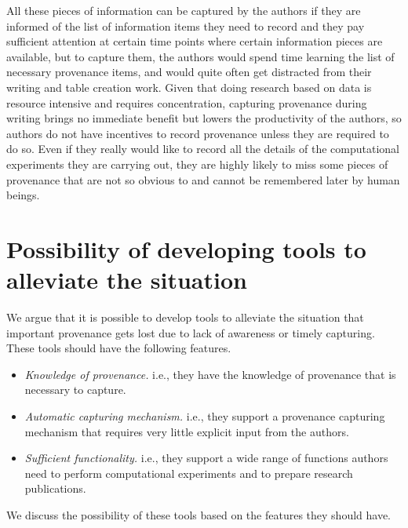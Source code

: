 All these pieces of information can be captured by the authors if they are informed of the list of 
information items they need to record and they pay sufficient attention at certain time points where 
certain information pieces are available, but to capture them, the authors would spend time learning the list of necessary provenance items, and would quite often get 
distracted from their writing and table creation work. Given that doing research based on data is 
resource intensive and requires concentration, capturing provenance during writing brings no 
immediate benefit but lowers the productivity of the authors, so authors do not have incentives to 
record provenance unless they are required to do so. Even if they really would like to record all the 
details of the computational experiments they are carrying out, they are highly likely to miss some 
pieces of provenance that are not so obvious to and cannot be remembered later by human beings. 


\section{Possibility of developing tools to alleviate the situation}
We argue that it is possible to develop tools to alleviate the situation that important provenance gets lost due to lack of awareness or timely capturing. These tools should have the following features.
\begin{itemize}
\item \emph{Knowledge of provenance.} i.e., they have the knowledge of provenance that is necessary to capture.
\item \emph{Automatic capturing mechanism.} i.e., they support a provenance capturing mechanism that requires very little explicit input from the authors.
\item \emph{Sufficient functionality.} i.e., they support a wide range of functions authors need to perform computational experiments and to prepare research publications.
\end{itemize}
We discuss the possibility of these tools based on the features they should have.

